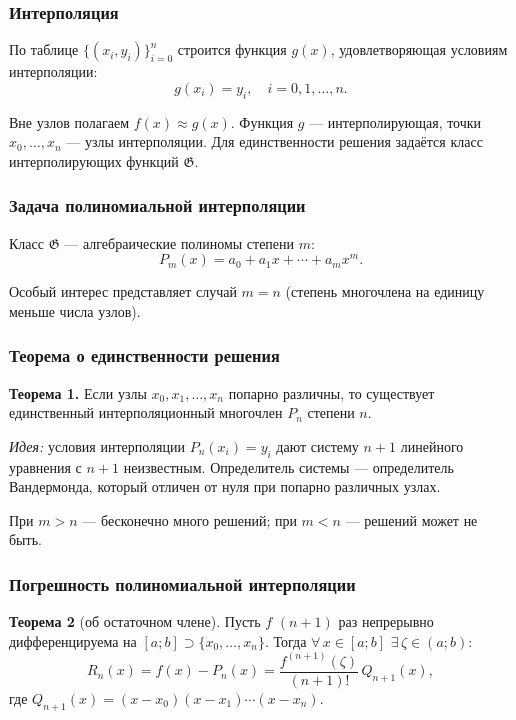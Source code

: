 \subsubsection*{Интерполяция}

По таблице $\{(x_i, y_i)\}_{i=0}^{n}$ строится функция $g(x)$, удовлетворяющая условиям интерполяции:
\[
    g(x_i) = y_i, \quad i = 0, 1, \ldots, n.
\]

Вне узлов полагаем $f(x) \approx g(x)$. Функция $g$ --- интерполирующая, точки $x_0, \ldots, x_n$ --- узлы интерполяции. Для единственности решения задаётся класс интерполирующих функций $\mathfrak{G}$.

\subsubsection*{Задача полиномиальной интерполяции}

Класс $\mathfrak{G}$ --- алгебраические полиномы степени $m$:
\[
    P_m(x) = a_0 + a_1 x + \cdots + a_m x^m.
\]

Особый интерес представляет случай $m = n$ (степень многочлена на единицу меньше числа узлов).

\subsubsection*{Теорема о единственности решения}

\textbf{Теорема 1.} Если узлы $x_0, x_1, \ldots, x_n$ попарно различны, то существует единственный интерполяционный многочлен $P_n$ степени $n$.

\textit{Идея:} условия интерполяции $P_n(x_i) = y_i$ дают систему $n+1$ линейного уравнения с $n+1$ неизвестным. Определитель системы --- определитель Вандермонда, который отличен от нуля при попарно различных узлах.

При $m > n$ --- бесконечно много решений; при $m < n$ --- решений может не быть.

\subsubsection*{Погрешность полиномиальной интерполяции}

\textbf{Теорема 2} (об остаточном члене). Пусть $f$ $(n+1)$ раз непрерывно дифференцируема на $[a; b] \supset \{x_0, \ldots, x_n\}$. Тогда $\forall\, x \in [a; b]$ $\exists\, \zeta \in (a; b)$:
\[
    R_n(x) = f(x) - P_n(x) = \frac{f^{(n+1)}(\zeta)}{(n+1)!}\, Q_{n+1}(x),
\]
где $Q_{n+1}(x) = (x - x_0)(x - x_1) \cdots (x - x_n)$.

